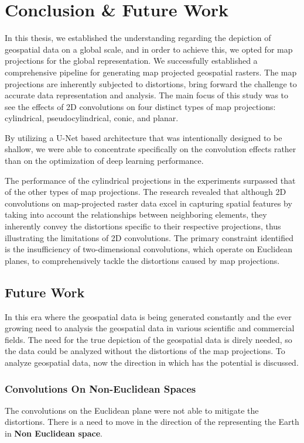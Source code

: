 
\clearpage
\cleardoublepage

\chapter{Conclusion \& Future Work}
\label{chap:conclusion_future_work}
In this thesis, we established the understanding regarding the depiction of geospatial data on a global scale, and in order to achieve this, we opted for map projections for the global representation.
We successfully established a comprehensive pipeline for generating map projected geospatial rasters. The map projections are inherently subjected to distortions, bring forward the challenge to accurate data representation and analysis.
The main focus of this study was to see the effects of 2D convolutions on four distinct types of map projections: cylindrical, pseudocylindrical, conic, and planar.

By utilizing a U-Net based architecture that was intentionally designed to be shallow, we were able to concentrate specifically on the convolution effects rather than on the optimization of deep learning performance.

The performance of the cylindrical projections in the experiments surpassed that of the other types of map projections.
The research revealed that although 2D convolutions on map-projected raster data excel in capturing spatial features by taking into account the relationships between neighboring elements,
they inherently convey the distortions specific to their respective projections, thus illustrating the limitations of 2D convolutions.
The primary constraint identified is the insufficiency of two-dimensional convolutions, which operate on Euclidean planes,
to comprehensively tackle the distortions caused by map projections.

\section{Future Work}
In this era where the geospatial data is being generated constantly and the ever growing need to analysis the geospatial data in various scientific and commercial fields. The need for the true depiction of the geospatial data is direly needed, so the data could be analyzed without the distortions of the map projections.
To analyze geospatial data, now the direction in which has the potential is discussed.
\subsection{Convolutions On Non-Euclidean Spaces}
The convolutions on the Euclidean plane were not able to mitigate the distortions.
There is a need to move in the direction of the representing the Earth in \textbf{Non Euclidean space}.

